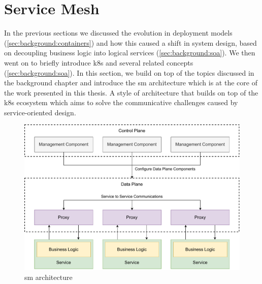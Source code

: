 \section{Service Mesh}
\label{sec:background:service-mesh}

In the previous sections we discussed the evolution in deployment models (\cref{sec:background:containers}) and how this caused a shift in system design, based on decoupling business logic into logical services (\cref{sec:background:soa}). We then went on to briefly introduce \gls{k8s} and several related concepts (\cref{sec:background:soa}). In this section, we build on top of the topics discussed in the background chapter and introduce the \gls{sm} architecture which is at the core of the work presented in this thesis. A style of architecture that builds on top of the \gls{k8s} ecosystem which aims to solve the communicative challenges caused by service-oriented design.



\begin{figure}[!t]
    \centering
    
    \includegraphics[width=\linewidth]{2_background/figures/service-mesh-architecture.pdf}

    \caption[Service Mesh Architecture]{\Gls{sm} architecture}
    \label{fig:service-mesh-architecture}
\end{figure}

